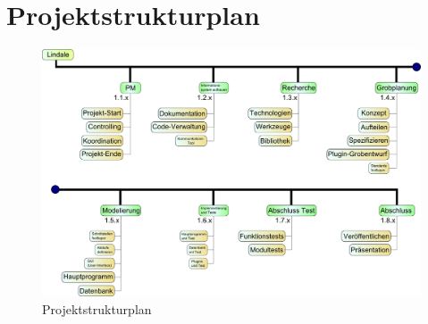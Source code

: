 \section{Projektstrukturplan}
\begin{figure}[!ht]
\includegraphics[width=\textwidth, height=\textheight, keepaspectratio, angle=0]{images/psp}
\caption{Projektstrukturplan}
\end{figure}